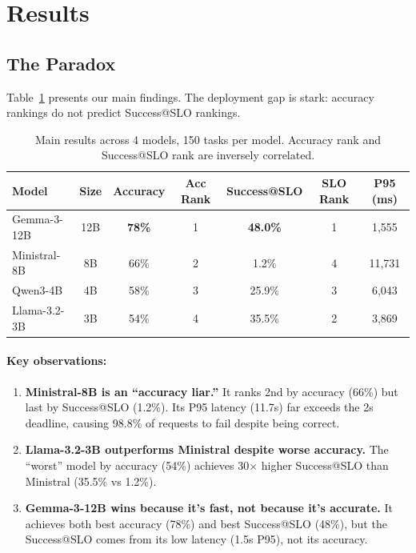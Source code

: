 \documentclass[11pt]{article}
\begin{document}
\section{Results}

\subsection{The Paradox}

Table~\ref{tab:main-results} presents our main findings.
The deployment gap is stark: accuracy rankings do not predict Success@SLO rankings.

\begin{table}[t]
\centering
\caption{Main results across 4 models, 150 tasks per model. Accuracy rank and Success@SLO rank are inversely correlated.}
\label{tab:main-results}
\begin{tabular}{lcccccc}
\toprule
\textbf{Model} & \textbf{Size} & \textbf{Accuracy} & \textbf{Acc Rank} & \textbf{Success@SLO} & \textbf{SLO Rank} & \textbf{P95 (ms)} \\
\midrule
Gemma-3-12B & 12B & \textbf{78\%} & 1 & \textbf{48.0\%} & 1 & 1,555 \\
Ministral-8B & 8B & 66\% & 2 & 1.2\% & 4 & 11,731 \\
Qwen3-4B & 4B & 58\% & 3 & 25.9\% & 3 & 6,043 \\
Llama-3.2-3B & 3B & 54\% & 4 & 35.5\% & 2 & 3,869 \\
\bottomrule
\end{tabular}
\end{table}

\paragraph{Key observations:}

\begin{enumerate}[leftmargin=12pt]
    \item \textbf{Ministral-8B is an ``accuracy liar.''} It ranks 2nd by accuracy (66\%) but last by Success@SLO (1.2\%). Its P95 latency (11.7s) far exceeds the 2s deadline, causing 98.8\% of requests to fail despite being correct.

    \item \textbf{Llama-3.2-3B outperforms Ministral despite worse accuracy.} The ``worst'' model by accuracy (54\%) achieves 30$\times$ higher Success@SLO than Ministral (35.5\% vs 1.2\%).

    \item \textbf{Gemma-3-12B wins because it's fast, not because it's accurate.} It achieves both best accuracy (78\%) and best Success@SLO (48\%), but the Success@SLO comes from its low latency (1.5s P95), not its accuracy.
\end{enumerate}
\end{document}
